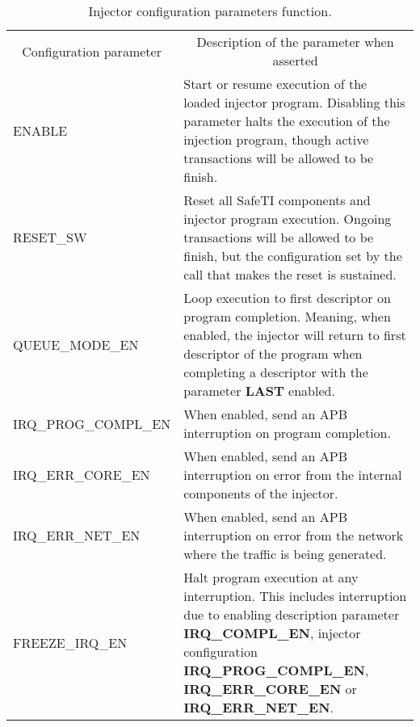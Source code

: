 \begin{table}[h]
  \begin{tabular}{@{}p{0.2\linewidth}p{0.8\linewidth}@{}}
    \toprule
    \multicolumn{1}{c}{Configuration parameter} & \multicolumn{1}{c}{Description of the parameter when asserted}                                                                                                                                                                      \\
    \cmidrule{1-2}
      ENABLE                & Start or resume execution of the loaded injector program. Disabling this parameter halts the execution of the injection program, though active transactions will be allowed to be finish.                                                               \\
      RESET\_SW             & Reset all SafeTI components and injector program execution. Ongoing transactions will be allowed to be finish, but the configuration set by the call that makes the reset is sustained.                                                                 \\
      QUEUE\_MODE\_EN       & Loop execution to first descriptor on program completion. Meaning, when enabled, the injector will return to first descriptor of the program when completing a descriptor with the parameter \textbf{LAST} enabled.                                     \\
      IRQ\_PROG\_COMPL\_EN  & When enabled, send an APB interruption on program completion.                                                                                                                                                                                           \\
      IRQ\_ERR\_CORE\_EN    & When enabled, send an APB interruption on error from the internal components of the injector.                                                                                                                                                           \\
      IRQ\_ERR\_NET\_EN     & When enabled, send an APB interruption on error from the network where the traffic is being generated.                                                                                                                                                  \\
      FREEZE\_IRQ\_EN       & Halt program execution at any interruption. This includes interruption due to enabling description parameter \textbf{IRQ\_COMPL\_EN}, injector configuration \textbf{IRQ\_PROG\_COMPL\_EN}, \textbf{IRQ\_ERR\_CORE\_EN} or \textbf{IRQ\_ERR\_NET\_EN}.  \\
    \bottomrule
  \end{tabular}
\caption{Injector configuration parameters function.}
\label{table:configuration}
\end{table}
